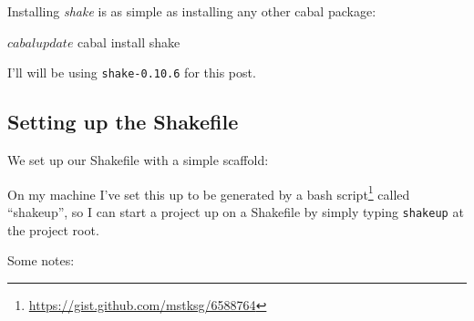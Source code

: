\documentclass[]{article}
\newenvironment{Shaded}{}{}
\newcommand{\CommentTok}[1]{\textcolor[rgb]{0.38,0.63,0.69}{\textit{#1}}}
\newcommand{\DataTypeTok}[1]{\textcolor[rgb]{0.56,0.13,0.00}{#1}}
\newcommand{\ExtensionTok}[1]{#1}
\newcommand{\FunctionTok}[1]{\textcolor[rgb]{0.02,0.16,0.49}{#1}}
\newcommand{\KeywordTok}[1]{\textcolor[rgb]{0.00,0.44,0.13}{\textbf{#1}}}
\newcommand{\NormalTok}[1]{#1}
\newcommand{\OtherTok}[1]{\textcolor[rgb]{0.00,0.44,0.13}{#1}}
\newcommand{\StringTok}[1]{\textcolor[rgb]{0.25,0.44,0.63}{#1}}
\renewcommand{\href}[2]{#2\footnote{\url{#1}}}
\begin{document}
Installing \emph{shake} is as simple as installing any other cabal package:

\begin{Shaded}
\begin{Highlighting}[]
\NormalTok{$ }\ExtensionTok{cabal}\NormalTok{ update}
\NormalTok{$ }\ExtensionTok{cabal}\NormalTok{ install shake}
\end{Highlighting}
\end{Shaded}

I'll will be using \texttt{shake-0.10.6} for this post.

\hypertarget{setting-up-the-shakefile}{%
\subsection{Setting up the Shakefile}\label{setting-up-the-shakefile}}

We set up our Shakefile with a simple scaffold:

\begin{Shaded}
\end{Shaded}

On my machine I've set this up to be generated by a
\href{https://gist.github.com/mstksg/6588764}{bash script} called ``shakeup'',
so I can start a project up on a Shakefile by simply typing \texttt{shakeup} at
the project root.

Some notes:
\end{document}
